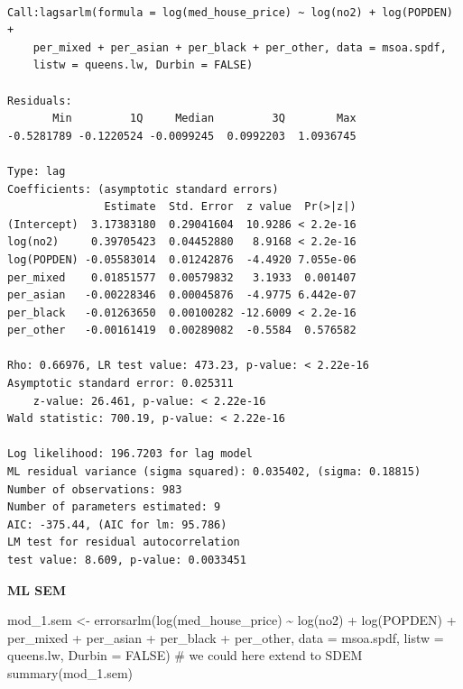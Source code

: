 \documentclass[
  letterpaper,
  DIV=11,
  numbers=noendperiod]{scrreprt}
\newenvironment{Shaded}{\begin{snugshade}}{\end{snugshade}}
\newcommand{\AttributeTok}[1]{\textcolor[rgb]{0.40,0.45,0.13}{#1}}
\newcommand{\CommentTok}[1]{\textcolor[rgb]{0.37,0.37,0.37}{#1}}
\newcommand{\ConstantTok}[1]{\textcolor[rgb]{0.56,0.35,0.01}{#1}}
\newcommand{\FunctionTok}[1]{\textcolor[rgb]{0.28,0.35,0.67}{#1}}
\newcommand{\NormalTok}[1]{\textcolor[rgb]{0.00,0.23,0.31}{#1}}
\newcommand{\OtherTok}[1]{\textcolor[rgb]{0.00,0.23,0.31}{#1}}
\newcommand{\SpecialCharTok}[1]{\textcolor[rgb]{0.37,0.37,0.37}{#1}}
\begin{document}
\begin{verbatim}

Call:lagsarlm(formula = log(med_house_price) ~ log(no2) + log(POPDEN) + 
    per_mixed + per_asian + per_black + per_other, data = msoa.spdf, 
    listw = queens.lw, Durbin = FALSE)

Residuals:
       Min         1Q     Median         3Q        Max 
-0.5281789 -0.1220524 -0.0099245  0.0992203  1.0936745 

Type: lag 
Coefficients: (asymptotic standard errors) 
               Estimate  Std. Error  z value  Pr(>|z|)
(Intercept)  3.17383180  0.29041604  10.9286 < 2.2e-16
log(no2)     0.39705423  0.04452880   8.9168 < 2.2e-16
log(POPDEN) -0.05583014  0.01242876  -4.4920 7.055e-06
per_mixed    0.01851577  0.00579832   3.1933  0.001407
per_asian   -0.00228346  0.00045876  -4.9775 6.442e-07
per_black   -0.01263650  0.00100282 -12.6009 < 2.2e-16
per_other   -0.00161419  0.00289082  -0.5584  0.576582

Rho: 0.66976, LR test value: 473.23, p-value: < 2.22e-16
Asymptotic standard error: 0.025311
    z-value: 26.461, p-value: < 2.22e-16
Wald statistic: 700.19, p-value: < 2.22e-16

Log likelihood: 196.7203 for lag model
ML residual variance (sigma squared): 0.035402, (sigma: 0.18815)
Number of observations: 983 
Number of parameters estimated: 9 
AIC: -375.44, (AIC for lm: 95.786)
LM test for residual autocorrelation
test value: 8.609, p-value: 0.0033451
\end{verbatim}

\textbf{ML SEM}

\begin{Shaded}
\begin{Highlighting}[]
\NormalTok{mod\_1.sem }\OtherTok{\textless{}{-}} \FunctionTok{errorsarlm}\NormalTok{(}\FunctionTok{log}\NormalTok{(med\_house\_price) }\SpecialCharTok{\textasciitilde{}} \FunctionTok{log}\NormalTok{(no2) }\SpecialCharTok{+} \FunctionTok{log}\NormalTok{(POPDEN) }\SpecialCharTok{+}
\NormalTok{                          per\_mixed }\SpecialCharTok{+}\NormalTok{ per\_asian }\SpecialCharTok{+}\NormalTok{ per\_black }\SpecialCharTok{+}\NormalTok{ per\_other,  }
                        \AttributeTok{data =}\NormalTok{ msoa.spdf, }
                        \AttributeTok{listw =}\NormalTok{ queens.lw,}
                        \AttributeTok{Durbin =} \ConstantTok{FALSE}\NormalTok{) }\CommentTok{\# we could here extend to SDEM}
\FunctionTok{summary}\NormalTok{(mod\_1.sem)}
\end{Highlighting}
\end{Shaded}
\end{document}
